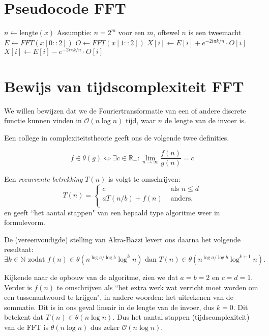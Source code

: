 \documentclass[11pt]{amsart}
\theoremstyle{definition}
\newcommand{\R}{\mathbb{R}}
\newcommand{\N}{\mathbb{N}}
\begin{document}
\section{Pseudocode FFT}
\begin{algorithmic}
\State $n \gets \text{lengte}(x)$ \Comment Assumptie: $n = 2^m$ voor een $m$, oftewel $n$ is een tweemacht
\Else
	\State $E \gets FFT(x[0::2])$ 
	\State $O \gets FFT(x[1::2])$ 
			\State $X[i] \gets E[i] + e^{-2i \pi k/n} \cdot O[i]$
		\Else
			\State $X[i] \gets E[i] - e^{-2i \pi k/n} \cdot O[i]$
		\EndIf
	\EndFor
\EndIf
\State {}
\EndFunction
\end{algorithmic}


\section{Bewijs van tijdscomplexiteit FFT}
We willen bewijzen dat we de Fouriertransformatie van een of andere discrete functie kunnen vinden in $\mathcal{O}(n \log n)$ tijd, waar $n$ de lengte van de invoer is.

Een college in complexiteitstheorie geeft ons de volgende twee definities. 

\[
f \in \theta(g) \Leftrightarrow \exists c \in \R_+: \lim_{n \to \infty} \frac{f(n)}{g(n)} = c
\]

Een \emph{recurrente betrekking} $T(n)$ is volgt te omschrijven:
\[
T(n) = \begin{cases}
  c &\text{ als } n \leq d \\
  a T(n/b) + f(n) &\text{ anders,} \\
\end{cases}
\]
en geeft ``het aantal stappen" van een bepaald type algoritme weer in formulevorm.

De (vereenvoudigde) stelling van Akra-Bazzi levert ons daarna het volgende resultaat:
\[
\exists k \in \N \text{ zodat }f(n) \in \theta(n^{\log a/\log b} \log^k n) \text{ dan } T(n) \in \theta(n^{\log a / \log b} \log^{k+1}n).
\]

Kijkende naar de opbouw van de algoritme, zien we dat $a=b=2$ en $c=d=1$. Verder is $f(n)$ te omschrijven als ``het extra werk wat verricht moet worden om een tussenantwoord te krijgen", in andere woorden: het uitrekenen van de sommatie. Dit is in ons geval lineair in de lengte van de invoer, dus $k=0$. Dit betekent dat $T(n) \in \theta(n \log n)$. Dus het aantal stappen (tijdscomplexiteit) van de FFT is $\theta(n \log n)$ dus zeker $\mathcal{O}(n \log n)$.
\end{document}
